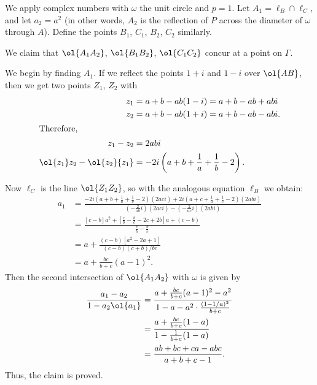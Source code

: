 \documentclass[11pt]{scrartcl}
\begin{document}
We apply complex numbers with $\omega$ the unit circle and $p=1$.  Let $A_1 = \ell_B \cap \ell_C$, and let $a_2 = a^2$ (in other words, $A_2$ is the reflection of $P$ across the diameter of $\omega$ through $A$).  Define the points $B_1$, $C_1$, $B_2$, $C_2$ similarly.

We claim that $\ol{A_1A_2}$, $\ol{B_1B_2}$, $\ol{C_1C_2}$ concur at a point on $\Gamma$.

We begin by finding $A_1$. If we reflect the points $1+i$ and $1-i$ over $\ol{AB}$, then we get two points $Z_1$, $Z_2$ with
\begin{align*}
  z_1 &= a+b-ab(1-i) = a+b-ab+abi \\
  z_2 &= a+b-ab(1+i) = a+b-ab-abi. \\
  \intertext{Therefore,}
  z_1 - z_2 &= 2abi  \\
  \ol{z_1}z_2 - \ol{z_2}{z_1}
    &= -2i \left( a+b+\frac1a+\frac1b-2 \right).
\end{align*}

Now $\ell_C$ is the line $\ol{Z_1Z_2}$,
so with the analogous equation $\ell_B$ we obtain:
\begin{align*}
  a_1 &= \frac{ -2i\left( a+b+\frac1a+\frac1b-2 \right)\left( 2ac i \right) +
    2i\left( a+c+\frac1a+\frac1c-2 \right)(2abi) }
    { \left( -\frac{2}{ab}i \right)
    \left( 2ac i \right) - \left( -\frac{2}{ac}i \right) \left( 2abi \right)} \\
  &= \frac{\left[ c-b \right]a^2 + \left[ \frac cb - \frac bc - 2c + 2b \right]a + (c-b)  }{\frac cb - \frac bc} \\
  &= a + \frac{(c-b)\left[ a^2-2a+1 \right]}{(c-b)(c+b)/bc} \\
  &= a + \frac{bc}{b+c} (a-1)^2.
\end{align*}
Then the second intersection of $\ol{A_1A_2}$ with $\omega$ is given by
\begin{align*}
  \frac{a_1-a_2}{1-a_2\ol{a_1}}
  &= \frac{a+\frac{bc}{b+c}(a-1)^2-a^2}{1-a-a^2 \cdot \frac{(1-1/a)^2}{b+c}} \\
  &= \frac{a + \frac{bc}{b+c}(1-a)}{1 - \frac{1}{b+c}(1-a)} \\
  &= \frac{ab+bc+ca - abc}{a+b+c-1}.
\end{align*}
Thus, the claim is proved.
\end{document}
